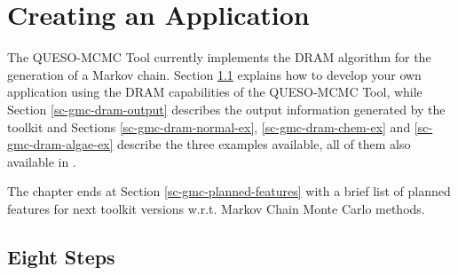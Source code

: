 \chapter{Creating an Application}\label{ch-gmc}
\thispagestyle{headings}

The QUESO-MCMC Tool currently implements the DRAM algorithm \cite{HaLaMiSa06} for the generation of a Markov chain.
Section \ref{sc-gmc-eight-steps} explains how to develop your own application using the DRAM capabilities of the QUESO-MCMC Tool, while
Section \ref{sc-gmc-dram-output} describes the output information generated by the toolkit and
Sections
\ref{sc-gmc-dram-normal-ex},
\ref{sc-gmc-dram-chem-ex} and
\ref{sc-gmc-dram-algae-ex}
describe the three examples available,
all of them also available in \cite{mcmctool}.

The chapter ends at Section \ref{sc-gmc-planned-features} with a brief list of planned features for next toolkit versions w.r.t. Markov Chain Monte Carlo methods.

\section{Eight Steps}\label{sc-gmc-eight-steps}

